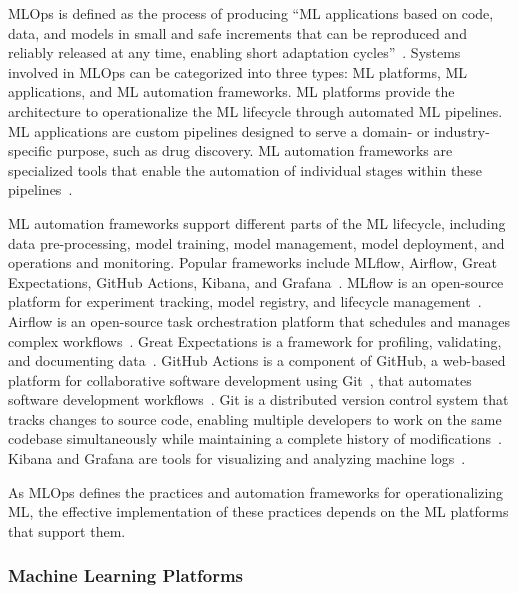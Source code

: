 \documentclass[
english,                 %
bibtex,                  %
includeExtraAbstracts, %
]{kththesis}
\numberwithin{listing}{chapter}
\begin{document}
\Gls{MLOps} is defined as the process of producing “\gls{ML} applications based on code, data, and models in small and safe increments that can be reproduced and reliably released at any time, enabling short adaptation cycles”~\cite{makinen_who_2021}. Systems involved in \gls{MLOps} can be categorized into three types: \gls{ML} platforms, \gls{ML} applications, and \gls{ML} automation frameworks. \Gls{ML} platforms provide the architecture to operationalize the \gls{ML} lifecycle through automated \gls{ML} pipelines. \Gls{ML} applications are custom pipelines designed to serve a domain- or industry-specific purpose, such as drug discovery. \Gls{ML} automation frameworks are specialized tools that enable the automation of individual stages within these pipelines~\cite{testi_mlops_2022}.

\Gls{ML} automation frameworks support different parts of the \gls{ML} lifecycle, including data pre-processing, model training, model management, model deployment, and operations and monitoring. Popular frameworks include \gls{ML}flow, Airflow, Great Expectations, GitHub Actions, Kibana, and Grafana~\cite{ruf_demystifying_2021}. \gls{ML}flow is an open-source platform for experiment tracking, model registry, and lifecycle management~\cite{zaharia_accelerating_2018}. Airflow is an open-source task orchestration platform that schedules and manages complex workflows~\cite{the_apache_software_foundation_airflow_2026}. Great Expectations is a framework for profiling, validating, and documenting data~\cite{gong_great_2026}. GitHub Actions is a component of GitHub, a web-based platform for collaborative software development using Git~\cite{github_inc_build_2026}, that automates software development workflows~\cite{github_inc_github_2026}. Git is a distributed version control system that tracks changes to source code, enabling multiple developers to work on the same codebase simultaneously while maintaining a complete history of modifications~\cite{the_linux_foundation_git_2026}. Kibana and Grafana are tools for visualizing and analyzing machine logs~\cite{elasticsearch_bv_kibana_2026, grafana_labs_grafana_2026}.

As \gls{MLOps} defines the practices and automation frameworks for operationalizing \gls{ML}, the effective implementation of these practices depends on the \gls{ML} platforms that support them.

\subsubsection{Machine Learning Platforms}
\end{document}
